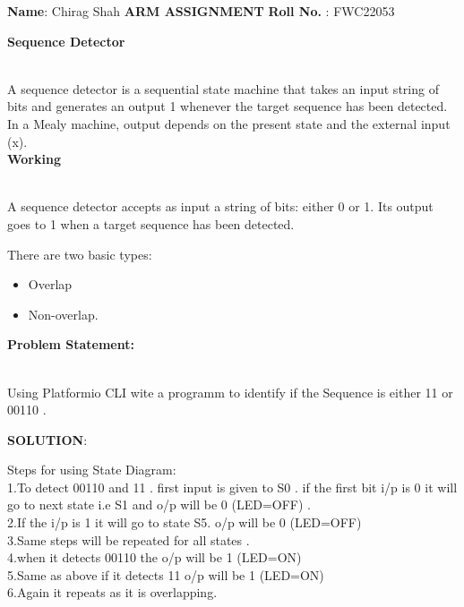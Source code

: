 \documentclass[10pt,a4paper]{report}
\begin{document}
\raggedright \textbf{Name}:\hspace{1mm} Chirag Shah\hspace{3cm} \Large \textbf{ARM ASSIGNMENT}\hspace{2.5cm} %
\normalsize \textbf{Roll No.} :\hspace{1mm} FWC22053\vspace{1cm}
\begin{multicols}{2}


\textbf{Sequence Detector}
\vspace{0.5cm}\raggedright \\A sequence detector is a sequential state machine that takes an input string of bits and generates an output 1 whenever the target sequence has been detected. In a Mealy machine, output depends on the present state and the external input (x).\vspace{3mm} \\ 
\textbf{Working}\vspace{1mm}
\raggedright \\A sequence detector accepts as input a string of bits: either 0 or 1. Its output goes to 1 when a target sequence has been detected.\vspace{3mm} \\ 
\raggedright There are two basic types:\vspace{3mm} 
\begin{itemize}
\item Overlap
\item Non-overlap. \vspace{2mm}
\end{itemize}
\raggedright \textbf{Problem Statement:}\vspace{2mm}
\raggedright \\Using Platformio CLI wite a programm to identify if the Sequence is either  11 or 00110 .

\vspace{5mm}

\raggedright \textbf{SOLUTION}:\vspace{2mm}
\raggedright Steps for using State Diagram:
\\1.To detect 00110 and 11 . first input is given to S0 . if the first bit i/p is 0 it will go to next state i.e S1 and o/p will be 0 (LED=OFF) . 
\\2.If the i/p is 1 it will go to state S5. o/p will be 0 (LED=OFF)
\\3.Same steps will be repeated for all states  .
\\4.when it detects 00110 the o/p will be 1 (LED=ON)
\\5.Same as above if it detects 11 o/p will be 1 (LED=ON)
\\6.Again it repeats as it is overlapping. \\


\end{multicols}
\end{document}
